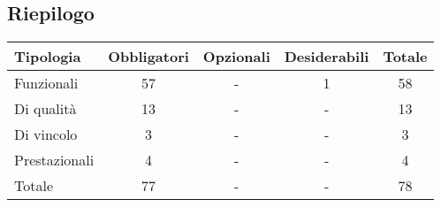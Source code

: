 \subsection{Riepilogo}
\begin{tabular}{|l|c|c|c|c|}
    \hline
    \textbf{Tipologia} & \textbf{Obbligatori} & \textbf{Opzionali} & \textbf{Desiderabili} & \textbf{Totale} \\
    \hline
    Funzionali & 57 & - & 1 & 58 \\
    \hline
    Di qualità & 13 & - & - & 13 \\
    \hline
    Di vincolo & 3 & - & - & 3 \\
    \hline
    Prestazionali & 4 & - & - & 4 \\
    \hline
    Totale & 77 & - & - & 78 \\
    \hline
\end{tabular}
